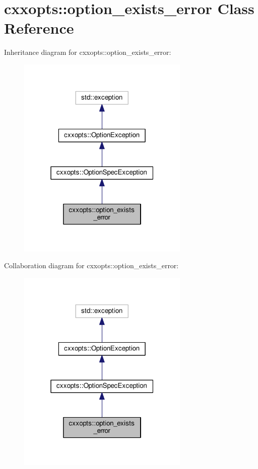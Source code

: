 \hypertarget{classcxxopts_1_1option__exists__error}{}\section{cxxopts\+:\+:option\+\_\+exists\+\_\+error Class Reference}
\label{classcxxopts_1_1option__exists__error}


Inheritance diagram for cxxopts\+:\+:option\+\_\+exists\+\_\+error\+:
\nopagebreak
\begin{figure}[H]
\begin{center}
\leavevmode
\includegraphics[width=232pt]{classcxxopts_1_1option__exists__error__inherit__graph}
\end{center}
\end{figure}


Collaboration diagram for cxxopts\+:\+:option\+\_\+exists\+\_\+error\+:
\nopagebreak
\begin{figure}[H]
\begin{center}
\leavevmode
\includegraphics[width=232pt]{classcxxopts_1_1option__exists__error__coll__graph}
\end{center}
\end{figure}
